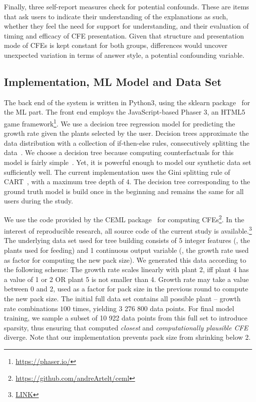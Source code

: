 Finally, three self-report measures check for potential confounds. 
These are items that ask users to indicate their understanding of the explanations as such, whether they feel the need for support for understanding, and their evaluation of timing and efficacy of \gls{CFE} presentation.
Given that structure and presentation mode of \glspl{CFE} is kept constant for both groups, differences would uncover unexpected variation in terms of answer style, a potential confounding variable.

\subsection{Implementation, ML Model and Data Set}
The back end of the system is written in Python3, using the sklearn package~\citep{pedregosa_scikit-learn_2011} for the \gls{ML} part. The front end employs the JavaScript-based Phaser 3, an HTML5 game framework\footnote{\url{https://phaser.io/}}.
We use a decision tree regression model for predicting the growth rate given the plants selected by the user.
Decision trees approximate the data distribution with a collection of if-then-else rules, consecutively splitting the data~\citep{shalev-shwartz_understanding_2014}.
We choose a decision tree because computing counterfactuals for this model is fairly simple~\citep{artelt_computation_2019}.
Yet, it is powerful enough to model our synthetic data set sufficiently well.
The current implementation uses the Gini splitting rule of CART~\citep{breiman_classification_1984}, with a maximum tree depth of $4$.
The decision tree corresponding to the ground truth model is build once in the beginning and remains the same for all users during the study. 

We use the code provided by the CEML package~\citep{artelt_ceml_2019} for computing \glspl{CFE}\footnote{\url{https://github.com/andreArtelt/ceml}}.
In the interest of reproducible research, all source code of the current study is available.\footnote{\url{LINK}} 
The underlying data set used for tree building consists of 5 integer features (\ie, the plants used for feeding) and 1 continuous output variable (\ie, the growth rate used as factor for computing the new pack size).
We generated this data according to the following scheme: The growth rate scales linearly with plant 2, iff plant 4 has a value of 1 or 2 OR plant 5 is not smaller than 4. 
Growth rate may take a value between 0 and 2, used as a factor for pack size in the previous round to compute the new pack size.
The initial full data set contains all possible plant -- growth rate combinations $100$ times, yielding 3 276 800 data points. 
For final model training, we sample a subset of 10 922 data points from this full set to introduce sparsity, thus ensuring that computed \textit{closest} and \textit{computationally plausible \gls{CFE}} diverge.
Note that our implementation prevents pack size from shrinking below 2.

